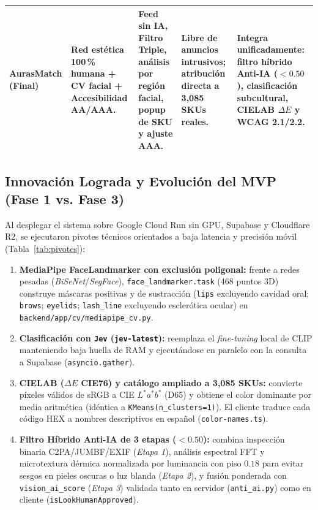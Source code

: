 \documentclass[conference]{IEEEtran}
\begin{document}
\begin{table}[t]
\begin{tabularx}{\textwidth}{>{\bfseries}p{2.3cm} p{3.1cm} p{3.1cm} p{2.8cm} X}
AurasMatch (Final) & Red estética 100\,\% humana + CV facial + Accesibilidad AA/AAA. & Feed sin IA, Filtro Triple, análisis por región facial, popup de SKU y ajuste AAA. & Libre de anuncios intrusivos; atribución directa a 3,085 SKUs reales. & \textbf{Integra unificadamente:} filtro híbrido Anti-IA ($< 0.50$), clasificación subcultural, CIELAB $\Delta E$ y WCAG 2.1/2.2. \\
\bottomrule
\end{tabularx}
\end{table}

\subsection{Innovación Lograda y Evolución del MVP (Fase 1 vs. Fase 3)}
Al desplegar el sistema sobre Google Cloud Run sin GPU, Supabase y Cloudflare R2, se ejecutaron pivotes técnicos orientados a baja latencia y precisión móvil (Tabla~\ref{tab:pivotes}):
\begin{enumerate}
    \item \textbf{MediaPipe FaceLandmarker con exclusión poligonal:} frente a redes pesadas (\textit{BiSeNet}/\textit{SegFace}), \texttt{face\_landmarker.task} (468 puntos 3D)~\cite{ref20} construye máscaras positivas y de sustracción (\texttt{lips} excluyendo cavidad oral; \texttt{brows}; \texttt{eyelids}; \texttt{lash\_line} excluyendo esclerótica ocular) en \texttt{backend/app/cv/mediapipe\_cv.py}.
    \item \textbf{Clasificación con \texttt{Jev} (\texttt{jev-latest}):} reemplaza el \textit{fine-tuning} local de CLIP manteniendo baja huella de RAM y ejecutándose en paralelo con la consulta a Supabase (\texttt{asyncio.gather}).
    \item \textbf{CIELAB ($\Delta E$ CIE76) y catálogo ampliado a 3,085 SKUs:} convierte píxeles válidos de sRGB a CIE $L^*a^*b^*$ (D65) y obtiene el color dominante por media aritmética (idéntica a \texttt{KMeans(n\_clusters=1)}). El cliente traduce cada código HEX a nombres descriptivos en español (\texttt{color-names.ts}).
    \item \textbf{Filtro Híbrido Anti-IA de 3 etapas ($< 0.50$):} combina inspección binaria C2PA/JUMBF/EXIF (\textit{Etapa 1}), análisis espectral FFT y microtextura dérmica normalizada por luminancia con piso $0.18$ para evitar sesgos en pieles oscuras o luz blanda (\textit{Etapa 2}), y fusión ponderada con \texttt{vision\_ai\_score} (\textit{Etapa 3}) validada tanto en servidor (\texttt{anti\_ai.py}) como en cliente (\texttt{isLookHumanApproved}).
\end{enumerate}
\end{document}

